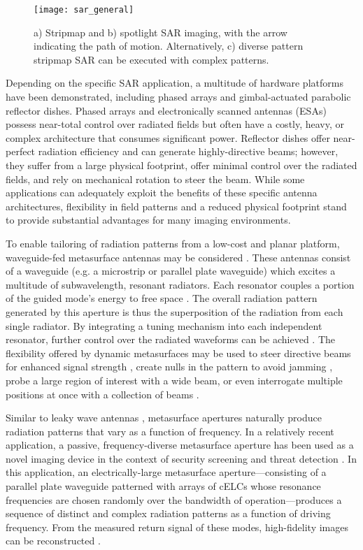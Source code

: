 \documentclass[journal]{IEEEtran}
\begin{document}
\begin{figure} 
	\centering
	\texttt{[image: sar\_general]}
	\caption{\label{fig:f1}a) Stripmap and b) spotlight SAR imaging, with the arrow indicating the path of motion. Alternatively, c) diverse pattern stripmap SAR can be executed with complex patterns.}
\end{figure}

Depending on the specific SAR application, a multitude of hardware platforms have been demonstrated, including phased arrays \cite{hansen2009phasedarray} and gimbal-actuated parabolic reflector dishes. Phased arrays and electronically scanned antennas (ESAs) \cite{johnson2015sidelobeCancel,patel2014ESA,patel2015ESA,lim2004CRLHsteer} possess near-total control over radiated fields but often have a costly, heavy, or complex architecture that consumes significant power. Reflector dishes offer near-perfect radiation efficiency and can generate highly-directive beams; however, they suffer from a large physical footprint, offer minimal control over the radiated fields, and rely on mechanical rotation to steer the beam. While some applications can adequately exploit the benefits of these specific antenna architectures, flexibility in field patterns and a reduced physical footprint stand to provide substantial advantages for many imaging environments.

To enable tailoring of radiation patterns from a low-cost and planar platform, waveguide-fed metasurface antennas may be considered \cite{hunt2013science}. These antennas consist of a waveguide (e.g. a microstrip or parallel plate waveguide) which excites a multitude of subwavelength, resonant radiators. Each resonator couples a portion of the guided mode's energy to free space \cite{landy2013WGhomogenization}. The overall radiation pattern generated by this aperture is thus the superposition of the radiation from each single radiator. By integrating a tuning mechanism into each independent resonator, further control over the radiated waveforms can be achieved \cite{sleasman2015DyAp1}. The flexibility offered by dynamic metasurfaces may be used to steer directive beams for enhanced signal strength \cite{lim2004CRLHsteer}, create nulls in the pattern to avoid jamming \cite{jammingSAR,jammingSAR2}, probe a large region of interest with a wide beam, or even interrogate multiple positions at once with a collection of beams \cite{mimosar}.

Similar to leaky wave antennas \cite{oliner1993leaky}, metasurface apertures naturally produce radiation patterns that vary as a function of frequency. In a relatively recent application, a passive, frequency-diverse metasurface aperture has been used as a novel imaging device in the context of security screening and threat detection \cite{hunt2014metaimager}. In this application, an electrically-large metasurface aperture---consisting of a parallel plate waveguide patterned with arrays of cELCs whose resonance frequencies are chosen randomly over the bandwidth of operation---produces a sequence of distinct and complex radiation patterns as a function of driving frequency. From the measured return signal of these modes, high-fidelity images can be reconstructed \cite{hunt2014metaimager}.
\end{document}
